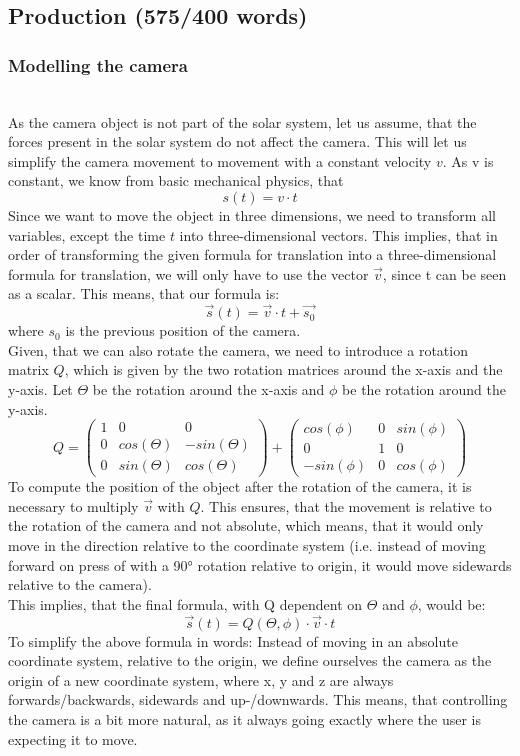 \documentclass[conference,compsoc]{IEEEtran}
\begin{document}
\subsection{Production (575/400 words)}
\subsubsection{Modelling the camera} \hfill \\
As the camera object is not part of the solar system, let us assume, that the forces present in the solar system do not affect the camera. This will let us simplify the camera movement to movement with a constant velocity $v$. As v is constant, we know from basic mechanical physics, that $$s(t) = v \cdot t$$ Since we want to move the object in three dimensions, we need to transform all variables, except the time $t$ into three-dimensional vectors. This implies, that in order of transforming the given formula for translation into a three-dimensional formula for translation, we will only have to use the vector $\vec{v}$, since t can be seen as a scalar. This means, that our formula is:
$$\vec{s}(t) = \vec{v} \cdot t + \vec{s_{0}}$$
where $s_{0}$ is the previous position of the camera.\\
Given, that we can also rotate the camera, we need to introduce a rotation matrix $Q$, which is given by the two rotation matrices around the x-axis and the y-axis.
Let $\Theta$ be the rotation around the x-axis and $\phi$ be the rotation around the y-axis.
$$ Q = \begin{pmatrix}
	1 & 0 & 0 \\
	0 & cos(\Theta) & -sin(\Theta)\\
	0 & sin(\Theta) & cos(\Theta)
\end{pmatrix}+\begin{pmatrix}
	cos(\phi) & 0 & sin(\phi) \\
	0 & 1 & 0 \\
	-sin(\phi) & 0 & cos(\phi)
\end{pmatrix} $$
To compute the position of the object after the rotation of the camera, it is necessary to multiply $\vec{v}$ with $Q$. This ensures, that the movement is relative to the rotation of the camera and not absolute, which means, that it would only move in the direction relative to the coordinate system (i.e. instead of moving forward on press of  with a 90° rotation relative to origin, it would move sidewards relative to the camera).\\
This implies, that the final formula, with Q dependent on $\Theta$ and $\phi$, would be: $$
\vec{s}(t) = Q(\Theta, \phi) \cdot \vec{v} \cdot t$$
\label{CamMov}
To simplify the above formula in words: Instead of moving in an absolute coordinate system, relative to the origin, we define ourselves the camera as the origin of a new coordinate system, where x, y and z are always forwards/backwards, sidewards and up-/downwards. This means, that controlling the camera is a bit more natural, as it always going exactly where the user is expecting it to move.
\end{document}
